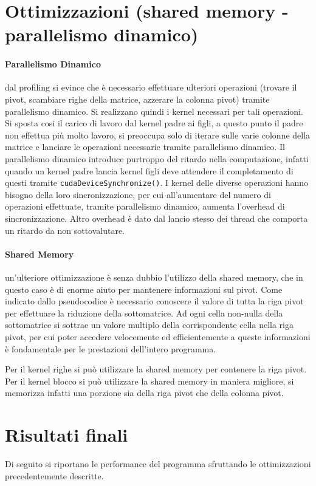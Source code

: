 \documentclass{article}
\begin{document}
\section{Ottimizzazioni (shared memory - parallelismo dinamico)}
\paragraph{Parallelismo Dinamico} dal profiling si evince che è necessario effettuare ulteriori operazioni (trovare il pivot, scambiare righe della matrice, azzerare la colonna pivot) tramite parallelismo dinamico. Si realizzano quindi i kernel necessari per tali operazioni. Si sposta cosi il carico di lavoro dal kernel padre ai figli, a questo punto il padre non effettua più molto lavoro, si preoccupa solo di iterare sulle varie colonne della matrice e lanciare le operazioni necessarie tramite parallelismo dinamico. Il parallelismo dinamico introduce purtroppo del ritardo nella computazione, infatti quando un kernel padre lancia kernel figli deve attendere il completamento di questi tramite \texttt{cudaDeviceSynchronize()}. I kernel delle diverse operazioni hanno bisogno della loro sincronizzazione, per cui all'aumentare del numero di operazioni effettuate, tramite parallelismo dinamico, aumenta l'overhead di sincronizzazione.  Altro overhead è dato dal lancio stesso dei thread che comporta un ritardo da non sottovalutare.

\paragraph{Shared Memory} un'ulteriore ottimizzazione è senza dubbio l'utilizzo della shared memory, che in questo caso è di enorme aiuto per mantenere informazioni sul pivot. Come indicato dallo pseudocodice è necessario conoscere il valore di tutta la riga pivot per effettuare la riduzione della sottomatrice. Ad ogni cella non-nulla della sottomatrice si sottrae un valore multiplo della corrispondente cella nella riga pivot, per cui poter accedere velocemente ed efficientemente a queste informazioni è fondamentale per le prestazioni dell'intero programma.

Per il kernel righe si può utilizzare la shared memory per contenere la riga pivot. Per il kernel blocco si può utilizzare la shared memory in maniera migliore, si memorizza infatti una porzione sia della riga pivot che della colonna pivot. 

\newpage
\section{Risultati finali}
Di seguito si riportano le performance del programma sfruttando le ottimizzazioni precedentemente descritte.
\end{document}
